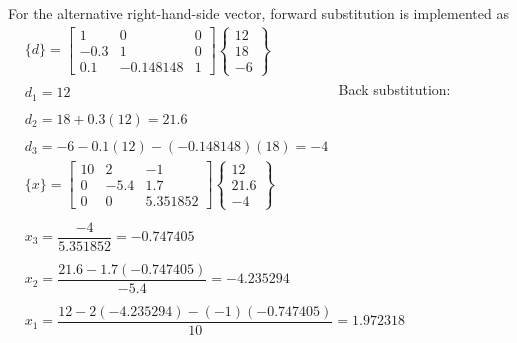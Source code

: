 \documentclass[../main.tex]{subfiles}
\begin{document}
\bigbreak
For the alternative right-hand-side vector, forward substitution is implemented as
\bigbreak$
\begin{aligned}
&\{d\}=\left[\begin{array}{ccc}
1 & 0 & 0 \\
-0.3 & 1 & 0 \\
0.1 & -0.148148 & 1
\end{array}\right]\left\{\begin{array}{c}
12 \\
18 \\
-6
\end{array}\right\} \\\\
&d_{1}=12 \\\\
&d_{2}=18+0.3(12)=21.6 \\\\
&d_{3}=-6-0.1(12)-(-0.148148)(18)=-4
\end{aligned}$
\bigbreak
\bigbreak
Back substitution:
\bigbreak
\bigbreak$
\begin{aligned}
&\{x\}=\left[\begin{array}{ccc}
10 & 2 & -1 \\
0 & -5.4 & 1.7 \\
0 & 0 & 5.351852
\end{array}\right]\left\{\begin{array}{c}
12 \\
21.6 \\
-4
\end{array}\right\} \\\\
&x_{3}=\dfrac{-4}{5.351852}=-0.747405 \\\\
&x_{2}=\dfrac{21.6-1.7(-0.747405)}{-5.4}=-4.235294 \\\\
&x_{1}=\dfrac{12-2(-4.235294)-(-1)(-0.747405)}{10}=1.972318
\end{aligned}$
\bigbreak
\end{document}
